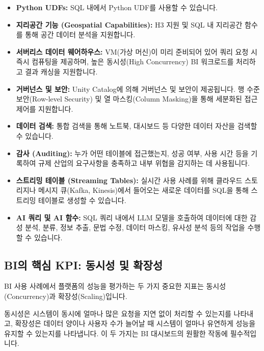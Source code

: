 \documentclass[11pt,a4paper]{article}
\begin{document}
\begin{itemize}
    \item \textbf{Python UDFs:} SQL 내에서 Python UDF를 사용할 수 있습니다.
    \item \textbf{지리공간 기능 (Geospatial Capabilities):} H3 지원 및 SQL 내 지리공간 함수를 통해 공간 데이터 분석을 지원합니다.
    \item \textbf{서버리스 데이터 웨어하우스:} VM(가상 머신)이 미리 준비되어 있어 쿼리 요청 시 즉시 컴퓨팅을 제공하며, 높은 동시성(High Concurrency) BI 워크로드를 처리하고 결과 캐싱을 지원합니다.
    \item \textbf{거버넌스 및 보안:} Unity Catalog에 의해 거버넌스 및 보안이 제공됩니다. 행 수준 보안(Row-level Security) 및 열 마스킹(Column Masking)을 통해 세분화된 접근 제어를 지원합니다.
    \item \textbf{데이터 검색:} 통합 검색을 통해 노트북, 대시보드 등 다양한 데이터 자산을 검색할 수 있습니다.
    \item \textbf{감사 (Auditing):} 누가 어떤 테이블에 접근했는지, 성공 여부, 사용 시간 등을 기록하여 규제 산업의 요구사항을 충족하고 내부 위협을 감지하는 데 사용됩니다.
    \item \textbf{스트리밍 테이블 (Streaming Tables):} 실시간 사용 사례를 위해 클라우드 스토리지나 메시지 큐(Kafka, Kinesis)에서 들어오는 새로운 데이터를 SQL을 통해 스트리밍 테이블로 생성할 수 있습니다.
    \item \textbf{AI 쿼리 및 AI 함수:} SQL 쿼리 내에서 LLM 모델을 호출하여 데이터에 대한 감성 분석, 분류, 정보 추출, 문법 수정, 데이터 마스킹, 유사성 분석 등의 작업을 수행할 수 있습니다.
\end{itemize}

\subsection{BI의 핵심 KPI: 동시성 및 확장성}
BI 사용 사례에서 플랫폼의 성능을 평가하는 두 가지 중요한 지표는 동시성(Concurrency)과 확장성(Scaling)입니다.

\begin{tcolorbox}[mybox={핵심 요약: BI 시스템의 체력과 유연성}]
동시성은 시스템이 동시에 얼마나 많은 요청을 지연 없이 처리할 수 있는지를 나타내고, 확장성은 데이터 양이나 사용자 수가 늘어날 때 시스템이 얼마나 유연하게 성능을 유지할 수 있는지를 나타냅니다. 이 두 가지는 BI 대시보드의 원활한 작동에 필수적입니다.
\end{tcolorbox}
\end{document}
